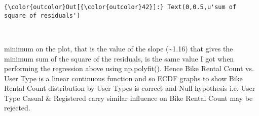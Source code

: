 \documentclass[11pt]{article}
\begin{document}
\begin{Verbatim}[commandchars=\\\{\}]
{\color{outcolor}Out[{\color{outcolor}42}]:} Text(0,0.5,u'sum of square of residuals')
\end{Verbatim}
            
    \begin{center}
    \end{center}
    { \hspace*{\fill} \\}
    
    minimum on the plot, that is the value of the slope
(\textasciitilde{}1.16) that gives the minimum sum of the square of the
residuals, is the same value I got when performing the regression above
using np.polyfit(). Hence Bike Rental Count vs. User Type is a linear
continuous function and so ECDF graphs to show Bike Rental Count
distribution by User Types is correct and Null hypothesis i.e. User Type
Casual \& Registered carry similar influence on Bike Rental Count may be
rejected.


    
    
    
    
\end{document}
